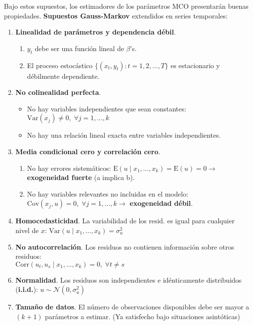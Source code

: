 \documentclass[10pt, a4paper, landscape]{article}
\newcommand{\E}{\mathrm{E}}
\newcommand{\Var}{\mathrm{Var}}
\newcommand{\Cov}{\mathrm{Cov}}
\newcommand{\Corr}{\mathrm{Corr}}
\begin{document}
\begin{multicols}{3}
		Bajo estos supuestos, los estimadores de los parámetros MCO presentarán buenas propiedades. \textbf{Supuestos Gauss-Markov} extendidos en series temporales:
		
		\begin{enumerate}[leftmargin=*, label=t\arabic{*}.]
			\item \textbf{Linealidad de parámetros y dependencia débil}.
			
			\begin{enumerate}[leftmargin=*, label=\alph{*}.]
				\item $y_{t}$ debe ser una función lineal de $\beta$'s.
				\item El proceso estocástico $\lbrace( x_{t}, y_{t}) : t = 1, 2, \ldots, T \rbrace$ es estacionario y débilmente dependiente.
			\end{enumerate}
			
			\item \textbf{No colinealidad perfecta}.
			
			\begin{itemize}[leftmargin=*]
				\item No hay variables independientes que sean constantes: $\Var(x_{j}) \neq 0, \; \forall j = 1, \ldots, k$
				\item No hay una relación lineal exacta entre variables independientes.
			\end{itemize}
			
			\item \textbf{Media condicional cero y correlación cero}.
			
			\begin{enumerate}[leftmargin=*, label=\alph{*}.]
				\item No hay errores sistemáticos: $\E(u \mid x_{1}, \ldots, x_{k}) = \E(u) = 0 \rightarrow$ \textbf{exogeneidad fuerte} (a implica b).
				\item No hay variables relevantes no incluidas en el modelo: $\Cov(x_{j} , u) = 0, \; \forall j = 1, \ldots, k \rightarrow$ \textbf{exogeneidad débil}.
			\end{enumerate}
			
			\item \textbf{Homocedasticidad}. La variabilidad de los resid. es igual para cualquier nivel de $x$: $\Var(u \mid x_{1}, \ldots, x_{k}) = \sigma^{2}_{u}$
			\item \textbf{No autocorrelación}. Los residuos no contienen información sobre otros residuos: \\
			$\Corr(u_{t}, u_{s} \mid x_{1}, \ldots, x_{k}) = 0, \; \forall t \neq s$
			\item \textbf{Normalidad}. Los residuos son independientes e idénticamente distribuidos (\textbf{i.i.d.}): $u \sim \mathcal{N}(0, \sigma^{2}_{u})$
			\item \textbf{Tamaño de datos}. El número de observaciones disponibles debe ser mayor a $(k + 1)$ parámetros a estimar. (Ya satisfecho bajo situaciones asintóticas)
		\end{enumerate}
		

\end{multicols}
\end{document}
